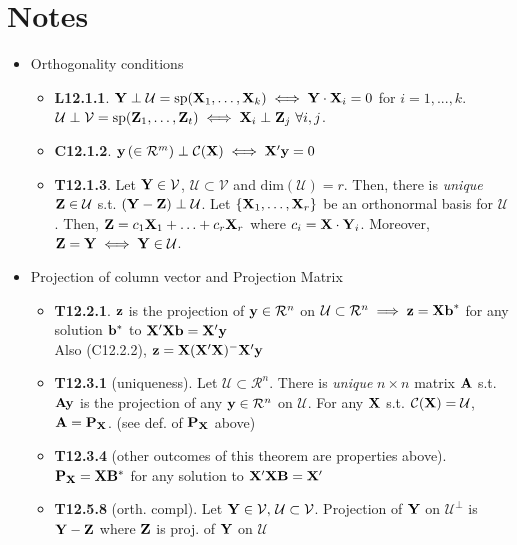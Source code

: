 \documentclass[a4paper, oneside]{book}
\begin{document}
\section*{Notes}
\begin{itemize}
\item Orthogonality conditions
	\begin{itemize}
	\item \textbf{L12.1.1}. $\mathbf{Y}\perp\mathcal{U}=\text{sp}(\mathbf{X}_1,\hdots,\mathbf{X}_k) \iff \mathbf{Y\cdot X}_i=0$ for $i=1,...,k$. $\mathcal{U\perp V}=\text{sp}(\mathbf{Z}_1,\hdots,\mathbf{Z}_t) \iff \mathbf{X}_i \perp \mathbf{Z}_j \,\,\forall i,j$.
	\item \textbf{C12.1.2}. $\mathbf{y}\, (\in \mathcal{R}^m) \perp \mathcal{C}(\mathbf{X}) \iff \mathbf{X}'\mathbf{y}=0$
	\item \textbf{T12.1.3}. Let $\mathbf{Y} \in \mathcal{V}$, $\mathcal{U}\subset \mathcal{V}$ and $\text{dim}(\mathcal{U})=r$. Then, there is \textit{unique} $\mathbf{Z} \in \mathcal{U}$ s.t. $(\mathbf{Y-Z})\perp \mathcal{U}$. Let $\{\mathbf{X}_1,\hdots,\mathbf{X}_r\}$ be an orthonormal basis for $\mathcal{U}$. Then, $\mathbf{Z}=c_1\mathbf{X}_1+\hdots+c_r\mathbf{X}_r$ where $c_i=\mathbf{X\cdot Y}_i$. Moreover, $\mathbf{Z=Y} \iff \mathbf{Y}\in\mathcal{U}$. 
	\end{itemize}
\item Projection of column vector and Projection Matrix
	\begin{itemize}
	\item \textbf{T12.2.1}. $\mathbf{z}$ is the projection of $\mathbf{y}\in\mathcal{R}^n$ on $\mathcal{U} \subset \mathcal{R}^n \implies \mathbf{z}=\mathbf{Xb}^*$ for any solution $\mathbf{b}^*$ to $\mathbf{X}'\mathbf{Xb}=\mathbf{X}'\mathbf{y}$ \\\hspace*{1.455cm} Also (C12.2.2), $\mathbf{z}=\mathbf{X}(\mathbf{X}'\mathbf{X})^-\mathbf{X}'\mathbf{y}$ 
	\item \textbf{T12.3.1} (uniqueness). Let $\mathcal{U} \subset \mathcal{R}^n$. There is \textit{unique} $n\times n$ matrix $\mathbf{A}$ s.t. $\mathbf{Ay}$ is the projection of any $\mathbf{y} \in \mathcal{R}^n$ on $\mathcal{U}$. For any $\mathbf{X}$ s.t. $\mathcal{C}(\mathbf{X})=\mathcal{U}$, $\mathbf{A}=\mathbf{P}_\mathbf{X}$. (see def. of $\mathbf{P}_\mathbf{X}$ above)
	\item \textbf{T12.3.4} (other outcomes of this theorem are properties above). $\mathbf{P}_\mathbf{X}=\mathbf{X}\mathbf{B}^*$ for any solution to $\mathbf{X}'\mathbf{XB}=\mathbf{X}'$
	\item \textbf{T12.5.8} (orth. compl). Let $\mathbf{Y}\in\mathcal{V},\, \mathcal{U}\subset\mathcal{V}$. Projection of $\mathbf{Y}$ on $\mathcal{U}^\perp$ is $\mathbf{Y-Z}$ where $\mathbf{Z}$ is proj. of $\mathbf{Y}$ on $\mathcal{U}$

\end{itemize}
\end{itemize}
\end{document}
